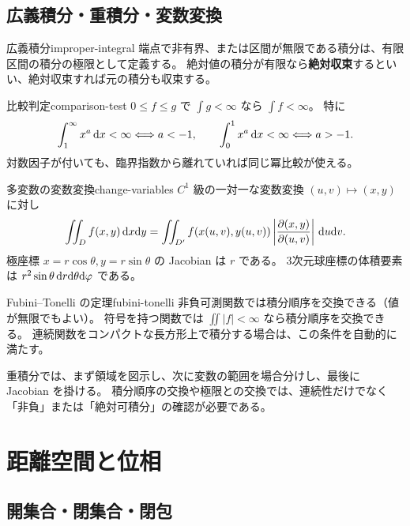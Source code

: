 \section{広義積分・重積分・変数変換}

\begin{definition}{広義積分}{improper-integral}
端点で非有界、または区間が無限である積分は、有限区間の積分の極限として定義する。
絶対値の積分が有限なら\textbf{絶対収束}するといい、絶対収束すれば元の積分も収束する。
\end{definition}

\begin{theorem}{比較判定}{comparison-test}
$0\le f\le g$ で $\int g<\infty$ なら $\int f<\infty$。
特に
\[
 \int_1^\infty x^a\,\mathrm{d} x<\infty\Longleftrightarrow a<-1,
 \qquad
 \int_0^1 x^a\,\mathrm{d} x<\infty\Longleftrightarrow a>-1.
\]
対数因子が付いても、臨界指数から離れていれば同じ冪比較が使える。
\end{theorem}

\begin{theorem}{多変数の変数変換}{change-variables}
$C^1$ 級の一対一な変数変換 $(u,v)\mapsto(x,y)$ に対し
\[
 \iint_D f(x,y)\,\mathrm{d} x\mathrm{d} y
 =\iint_{D'}f(x(u,v),y(u,v))
 \left|\frac{\partial(x,y)}{\partial(u,v)}\right|\,\mathrm{d} u\mathrm{d} v.
\]
極座標 $x=r\cos\theta,y=r\sin\theta$ の Jacobian は $r$ である。
3次元球座標の体積要素は $r^2\sin\theta\,\mathrm{d} r\mathrm{d}\theta\mathrm{d}\varphi$ である。
\end{theorem}

\begin{theorem}{Fubini--Tonelli の定理}{fubini-tonelli}
非負可測関数では積分順序を交換できる（値が無限でもよい）。
符号を持つ関数では $\iint|f|<\infty$ なら積分順序を交換できる。
連続関数をコンパクトな長方形上で積分する場合は、この条件を自動的に満たす。
\end{theorem}

\begin{memo*}
重積分では、まず領域を図示し、次に変数の範囲を場合分けし、最後に Jacobian を掛ける。
積分順序の交換や極限との交換では、連続性だけでなく「非負」または「絶対可積分」の確認が必要である。
\end{memo*}

\chapter{距離空間と位相}
\label{ch:metric-topology}

\section{開集合・閉集合・閉包}

